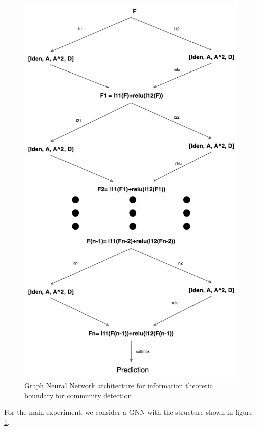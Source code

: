\begin{figure}[H]
\begin{center}
  \includegraphics[scale=0.47]{GNN_SBM.png}
  \caption{Graph Neural Network architecture for information theoretic boundary for community detection.}
  \label{fig:GNN}
\end{center}
\end{figure}

For the main experiment, we consider a GNN with the structure shown in figure \ref{fig:GNN}.

